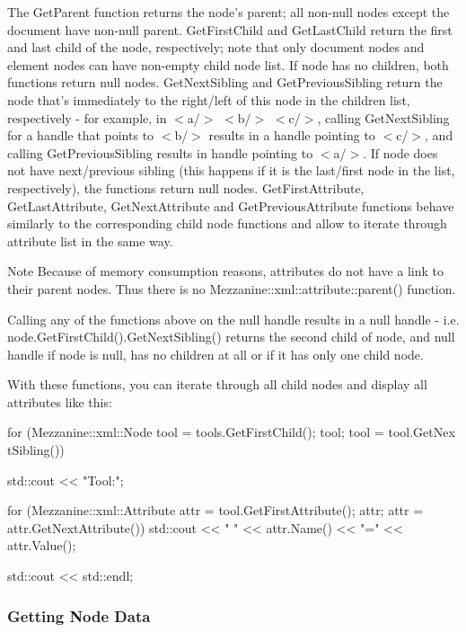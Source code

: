  The GetParent function returns the node's parent; all non-\/null nodes except the document have non-\/null parent. GetFirstChild and GetLastChild return the first and last child of the node, respectively; note that only document nodes and element nodes can have non-\/empty child node list. If node has no children, both functions return null nodes. GetNextSibling and GetPreviousSibling return the node that's immediately to the right/left of this node in the children list, respectively -\/ for example, in $<$a/$>$ $<$b/$>$ $<$c/$>$, calling GetNextSibling for a handle that points to $<$b/$>$ results in a handle pointing to $<$c/$>$, and calling GetPreviousSibling results in handle pointing to $<$a/$>$. If node does not have next/previous sibling (this happens if it is the last/first node in the list, respectively), the functions return null nodes. GetFirstAttribute, GetLastAttribute, GetNextAttribute and GetPreviousAttribute functions behave similarly to the corresponding child node functions and allow to iterate through attribute list in the same way. \begin{DoxyNote}{Note}
Because of memory consumption reasons, attributes do not have a link to their parent nodes. Thus there is no Mezzanine::xml::attribute::parent() function.
\end{DoxyNote}
Calling any of the functions above on the null handle results in a null handle -\/ i.e. node.GetFirstChild().GetNextSibling() returns the second child of node, and null handle if node is null, has no children at all or if it has only one child node. \par
 \par
 With these functions, you can iterate through all child nodes and display all attributes like this: 
\begin{DoxyCode}
 for (Mezzanine::xml::Node tool = tools.GetFirstChild(); tool; tool = tool.GetNex
      tSibling())
 {
     std::cout << "Tool:";

     for (Mezzanine::xml::Attribute attr = tool.GetFirstAttribute(); attr; attr =
       attr.GetNextAttribute())
     {
         std::cout << " " << attr.Name() << "=" << attr.Value();
     }

     std::cout << std::endl;
 }
\end{DoxyCode}
 \hypertarget{XMLManual_XMLAccessingNodeData}{}\subsubsection{Getting Node Data}\label{XMLManual_XMLAccessingNodeData}
